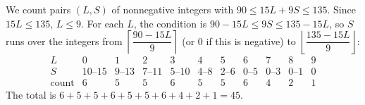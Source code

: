 We count pairs $(L,S)$ of nonnegative integers with $90\le15L+9S\le135$. Since $15L\le135$, $L\le9$. For each $L$, the condition is $90-15L\le9S\le135-15L$, so $S$ runs over the integers from $\left\lceil\dfrac{90-15L}{9}\right\rceil$ (or $0$ if this is negative) to $\left\lfloor\dfrac{135-15L}{9}\right\rfloor$:
\[
\begin{array}{c|cccccccccc}
L&0&1&2&3&4&5&6&7&8&9\\\hline
S&10\text{--}15&9\text{--}13&7\text{--}11&5\text{--}10&4\text{--}8&2\text{--}6&0\text{--}5&0\text{--}3&0\text{--}1&0\\
\text{count}&6&5&5&6&5&5&6&4&2&1
\end{array}
\]
The total is $6+5+5+6+5+5+6+4+2+1=\boxed{45}$.
